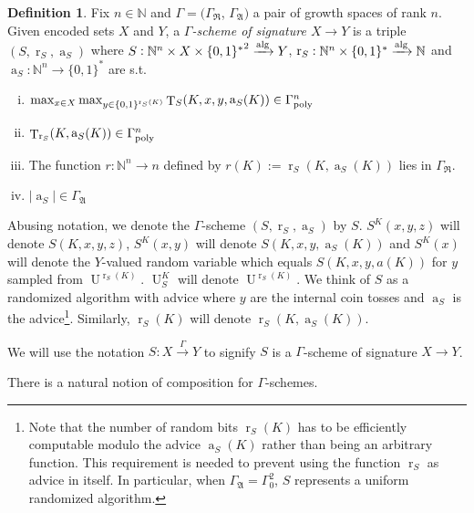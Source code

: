 \documentclass{article}
\numberwithin{equation}{section}
\theoremstyle{definition}
\newtheorem{definition}{Definition}[section]
\theoremstyle{plain}
\newcommand{\Bool}{\{0,1\}}
\newcommand{\Words}{{\Bool^*}}
\DeclareMathOperator{\T}{T}
\DeclareMathOperator{\R}{r}
\DeclareMathOperator{\A}{a}
\DeclareMathOperator{\Un}{U}
\newcommand{\Nats}{\mathbb{N}}
\newcommand{\NatFun}{\Nats^n \rightarrow}
\newcommand{\Abs}[1]{\lvert #1 \rvert}
\newcommand{\GrowR}{\Gamma_{\mathfrak{R}}}
\newcommand{\GrowA}{\Gamma_{\mathfrak{A}}}
\newcommand{\BoolR}[1]{\Bool^{\R_{#1}(K)}}
\newcommand{\GammaPoly}{\Gamma_{\textnormal{poly}}}
\newcommand{\Alg}{\xrightarrow{\textnormal{alg}}}
\newcommand{\Scheme}{\xrightarrow{\Gamma}}
\begin{document}
\begin{samepage}
\begin{definition}

Fix $n \in \Nats$ and $\Gamma=(\GrowR$, $\GrowA)$ a pair of growth spaces of rank $n$. Given encoded sets $X$ and $Y$, a \emph{$\Gamma$-scheme of signature $X \rightarrow Y$} is a triple $(S,\R_S,\A_S)$ where ${S: \Nats^n \times X \times \Words^2 \Alg Y}$, $\R_S: \Nats^n \times \Words \Alg \Nats$ and $\A_S: \NatFun \Words$ are s.t.

\begin{enumerate}[(i)]

\item $\max_{x \in X} \max_{y \in \BoolR{S}} \T_S(K,x,y,\A_S(K)) \in \GammaPoly^n$

\item $\T_{\R_S}(K,\A_S(K)) \in \GammaPoly^n$

\item The function $r: \NatFun n$ defined by $r(K):=\R_S(K,\A_S(K))$ lies in $\GrowR$.

\item $\Abs{\A_S} \in \GrowA$

\end{enumerate}

Abusing notation, we denote the $\Gamma$-scheme $(S,\R_S,\A_S)$ by $S$. $S^K(x,y,z)$ will denote $S(K,x,y,z)$, $S^K(x,y)$ will denote $S(K,x,y,\A_S(K))$ and $S^K(x)$ will denote the $Y$-valued random variable which equals $S(K,x,y,a(K))$ for $y$ sampled from $\Un^{\R_S(K)}$. $\Un_S^K$ will denote $\Un^{\R_S(K)}$. We think of $S$ as a randomized algorithm with advice where $y$ are the internal coin tosses and $\A_S$ is the advice\footnote{Note that the number of random bits $\R_S(K)$ has to be efficiently computable modulo the advice $\A_S(K)$ rather than being an arbitrary function. This requirement is needed to prevent using the function $\R_S$ as advice in itself. In particular, when $\GrowA=\Gamma_0^2$, $S$ represents a uniform randomized algorithm.}. Similarly, $\R_S(K)$ will denote $\R_S(K,\A_S(K))$.

We will use the notation $S: X \Scheme Y$ to signify $S$ is a $\Gamma$-scheme of signature $X \rightarrow Y$.

\end{definition}
\end{samepage}

There is a natural notion of composition for $\Gamma$-schemes.
\end{document}
